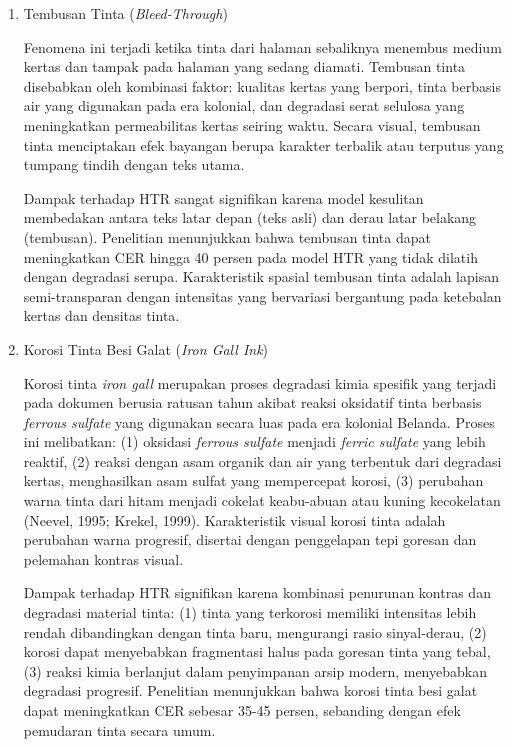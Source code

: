 \documentclass[12pt,a4paper]{article}
\begin{document}
\begin{enumerate}[leftmargin=*, labelindent=0pt, itemsep=1ex, topsep=0pt]

\item Tembusan Tinta (\textit{Bleed-Through})
\label{para:bleed-through}

Fenomena ini terjadi ketika tinta dari halaman sebaliknya menembus medium kertas dan tampak pada halaman yang sedang diamati. Tembusan tinta disebabkan oleh kombinasi faktor: kualitas kertas yang berpori, tinta berbasis air yang digunakan pada era kolonial, dan degradasi serat selulosa yang meningkatkan permeabilitas kertas seiring waktu. Secara visual, tembusan tinta menciptakan efek bayangan berupa karakter terbalik atau terputus yang tumpang tindih dengan teks utama.

Dampak terhadap HTR sangat signifikan karena model kesulitan membedakan antara teks latar depan (teks asli) dan derau latar belakang (tembusan). Penelitian \parencite{gatos2006} menunjukkan bahwa tembusan tinta dapat meningkatkan CER hingga 40 persen pada model HTR yang tidak dilatih dengan degradasi serupa. Karakteristik spasial tembusan tinta adalah lapisan semi-transparan dengan intensitas yang bervariasi bergantung pada ketebalan kertas dan densitas tinta.

\item Korosi Tinta Besi Galat (\textit{Iron Gall Ink})
\label{para:korosi-tinta}

Korosi tinta \textit{iron gall} merupakan proses degradasi kimia spesifik yang terjadi pada dokumen berusia ratusan tahun akibat reaksi oksidatif tinta berbasis \textit{ferrous sulfate} yang digunakan secara luas pada era kolonial Belanda. Proses ini melibatkan: (1) oksidasi \textit{ferrous sulfate} menjadi \textit{ferric sulfate} yang lebih reaktif, (2) reaksi dengan asam organik dan air yang terbentuk dari degradasi kertas, menghasilkan asam sulfat yang mempercepat korosi, (3) perubahan warna tinta dari hitam menjadi cokelat keabu-abuan atau kuning kecokelatan (Neevel, 1995; Krekel, 1999). Karakteristik visual korosi tinta adalah perubahan warna progresif, disertai dengan penggelapan tepi goresan dan pelemahan kontras visual.

Dampak terhadap HTR signifikan karena kombinasi penurunan kontras dan degradasi material tinta: (1) tinta yang terkorosi memiliki intensitas lebih rendah dibandingkan dengan tinta baru, mengurangi rasio sinyal-derau, (2) korosi dapat menyebabkan fragmentasi halus pada goresan tinta yang tebal, (3) reaksi kimia berlanjut dalam penyimpanan arsip modern, menyebabkan degradasi progresif. Penelitian menunjukkan bahwa korosi tinta besi galat dapat meningkatkan CER sebesar 35-45 persen, sebanding dengan efek pemudaran tinta secara umum.


\end{enumerate}
\end{document}
